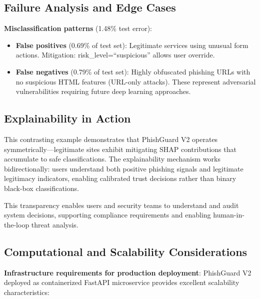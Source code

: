 \documentclass[conference]{IEEEtran}
\begin{document}
\subsection{Failure Analysis and Edge Cases}

\textbf{Misclassification patterns} (1.48\% test error):
\begin{itemize}
\item \textbf{False positives} (0.69\% of test set): Legitimate services using unusual form actions. Mitigation: risk\_level=``suspicious'' allows user override.
\item \textbf{False negatives} (0.79\% of test set): Highly obfuscated phishing URLs with no suspicious HTML features (URL-only attacks). These represent adversarial vulnerabilities requiring future deep learning approaches.
\end{itemize}

\subsection{Explainability in Action}

This contrasting example demonstrates that PhishGuard V2 operates symmetrically—legitimate sites exhibit mitigating SHAP contributions that accumulate to safe classifications. The explainability mechanism works bidirectionally: users understand both positive phishing signals and legitimate legitimacy indicators, enabling calibrated trust decisions rather than binary black-box classifications.

This transparency enables users and security teams to understand and audit system decisions, supporting compliance requirements and enabling human-in-the-loop threat analysis.

\subsection{Computational and Scalability Considerations}

\textbf{Infrastructure requirements for production deployment}: PhishGuard V2 deployed as containerized FastAPI microservice provides excellent scalability characteristics:
\end{document}
